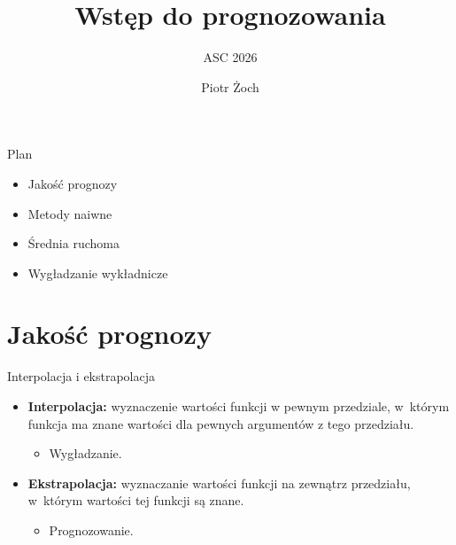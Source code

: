 \documentclass[11pt,usenames,dvipsnames,aspectratio=169]{beamer}
\title{Wstęp do prognozowania}
\subtitle{ASC 2026}
\author{Piotr Żoch}
\date{}
\begin{document}
\begin{frame}[plain]
\vspace*{-0.6cm}
\titlepage
\end{frame}

\begin{frame}{Plan}
\begin{itemize}
    \item Jakość prognozy
    \item Metody naiwne
    \item Średnia ruchoma
    \item Wygładzanie wykładnicze
\end{itemize}
\end{frame}

\section{Jakość prognozy}

\begin{frame}{Interpolacja i ekstrapolacja}
\begin{itemize}
    \item \textbf{Interpolacja:} wyznaczenie wartości funkcji w pewnym przedziale, w~którym funkcja ma znane wartości dla pewnych argumentów z tego przedziału.
    \begin{itemize}
        \item Wygładzanie.
    \end{itemize}
    \item \textbf{Ekstrapolacja:} wyznaczanie wartości funkcji na zewnątrz przedziału, w~którym wartości tej funkcji są znane.
    \begin{itemize}
        \item Prognozowanie.
    \end{itemize}
\end{itemize}
\end{frame}
\end{document}
